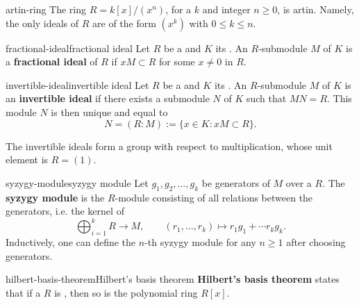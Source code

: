 \begin{example}{artin-ring}
    The ring $R = k[x] / (x^n)$, for a  $k$ and integer $n \ge 0$, is artin. Namely, the only ideals of $R$ are of the form $(x^k)$ with $0 \le k \le n$. 
\end{example}

\begin{topic}{fractional-ideal}{fractional ideal}
    Let $R$ be a  and $K$ its . An $R$-submodule $M$ of $K$ is a \textbf{fractional ideal} of $R$ if $xM \subset R$ for some $x \ne 0$ in $R$.
\end{topic}

\begin{topic}{invertible-ideal}{invertible ideal}
    Let $R$ be a  and $K$ its . An $R$-submodule $M$ of $K$ is an \textbf{invertible ideal} if there exists a submodule $N$ of $K$ such that $MN = R$. This module $N$ is then unique and equal to
    \[ N = (R : M) := \{ x \in K : xM \subset R \} . \]
    
    The invertible ideals form a group with respect to multiplication, whose unit element is $R = (1)$.
\end{topic}

\begin{topic}{syzygy-module}{syzygy module}
    Let $g_1, g_2, \ldots, g_k$ be generators of  $M$ over a  $R$. The \textbf{syzygy module} is the $R$-module consisting of all relations between the generators, i.e. the kernel of
    \[ \bigoplus_{i = 1}^{k} R \to M, \qquad (r_1, \ldots, r_k) \mapsto r_1 g_1 + \cdots r_k g_k . \]
    Inductively, one can define the $n$-th syzygy module for any $n \ge 1$ after choosing generators.
\end{topic}

\begin{topic}{hilbert-basis-theorem}{Hilbert's basis theorem}
    \textbf{Hilbert's basis theorem} states that if a  $R$ is , then so is the polynomial ring $R[x]$.
\end{topic}


